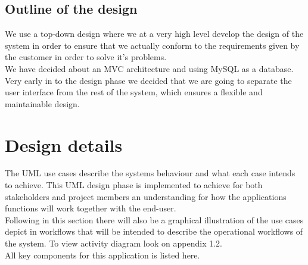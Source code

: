 \documentclass[a4paper,12pt]{article}
\begin{document}
\subsection{Outline of the design}
We use a top-down design where we at a very high level develop the design of the system in order to ensure that we actually conform to the requirements given by the customer in order to solve it's problems. \\
We have decided about an MVC architecture and using MySQL as a database.\\ 

Very early in to the design phase we decided that we are going to separate the user interface from the rest of the system, which ensures a flexible and maintainable design.

\clearpage
\section{Design details}
The UML use cases describe the systems behaviour and what each case intends to achieve. This UML design phase is implemented to achieve for both stakeholders and project members an understanding for how the applications functions will work together with the end-user.  \\

Following in this section there will also be a graphical illustration of the use cases depict in workflows that will be intended to describe the operational workflows of the system. To view activity diagram look on appendix 1.2.\\

All key components for this application is listed here.\\
\end{document}

